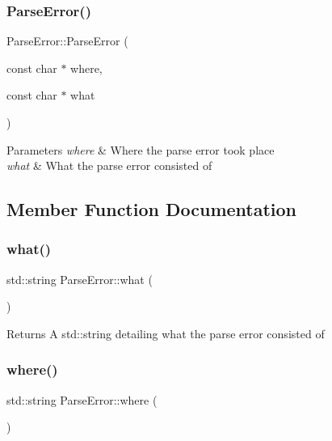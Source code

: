 \subsubsection{\texorpdfstring{Parse\+Error()}{ParseError()}}
{\footnotesize\ttfamily Parse\+Error\+::\+Parse\+Error (\begin{DoxyParamCaption}\item[{const char $\ast$}]{where,  }\item[{const char $\ast$}]{what }\end{DoxyParamCaption})\hspace{0.3cm}{\ttfamily [inline]}}


\begin{DoxyParams}{Parameters}
{\em where} & Where the parse error took place\\
\hline
{\em what} & What the parse error consisted of \\
\hline
\end{DoxyParams}


\subsection{Member Function Documentation}
\mbox{\label{class_parse_error_a08560dce27779ffee6c4bfb0d796aa6e}} 
\subsubsection{\texorpdfstring{what()}{what()}}
{\footnotesize\ttfamily std\+::string Parse\+Error\+::what (\begin{DoxyParamCaption}{ }\end{DoxyParamCaption})\hspace{0.3cm}{\ttfamily [inline]}}

\begin{DoxyReturn}{Returns}
A std\+::string detailing what the parse error consisted of 
\end{DoxyReturn}
\mbox{\label{class_parse_error_aa725d47c84792c9142267e51c2074f58}} 
\subsubsection{\texorpdfstring{where()}{where()}}
{\footnotesize\ttfamily std\+::string Parse\+Error\+::where (\begin{DoxyParamCaption}{ }\end{DoxyParamCaption})\hspace{0.3cm}{\ttfamily [inline]}}

